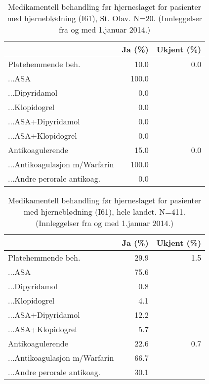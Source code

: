 \documentclass [norsk,a4paper,twoside]{article}\usepackage[]{graphicx}\usepackage[]{color}
\begin{document}
		
\begin{table}[ht]
\centering
\begin{tabular}{lrr}
  \hline
 & Ja (\%) & Ukjent (\%) \\ 
  \hline
Platehemmende beh. & 10.0 & 0.0 \\ 
  ...ASA & 100.0 &  \\ 
  ...Dipyridamol & 0.0 &  \\ 
  ...Klopidogrel & 0.0 &  \\ 
  ...ASA+Dipyridamol & 0.0 &  \\ 
  ...ASA+Klopidogrel & 0.0 &  \\ 
  Antikoagulerende & 15.0 & 0.0 \\ 
  ...Antikoagulasjon m/Warfarin & 100.0 &  \\ 
  ...Andre perorale antikoag. & 0.0 &  \\ 
   \hline
\end{tabular}
\caption{Medikamentell behandling før hjerneslaget for pasienter med hjerneblødning (I61), St. Olav. N=20. (Innleggelser fra og med 1.januar 2014.)} 
\label{tab:MedBehPre1Diag1}
\end{table}
\begin{table}[ht]
\centering
\begin{tabular}{lrr}
  \hline
 & Ja (\%) & Ukjent (\%) \\ 
  \hline
Platehemmende beh. & 29.9 & 1.5 \\ 
  ...ASA & 75.6 &  \\ 
  ...Dipyridamol & 0.8 &  \\ 
  ...Klopidogrel & 4.1 &  \\ 
  ...ASA+Dipyridamol & 12.2 &  \\ 
  ...ASA+Klopidogrel & 5.7 &  \\ 
  Antikoagulerende & 22.6 & 0.7 \\ 
  ...Antikoagulasjon m/Warfarin & 66.7 &  \\ 
  ...Andre perorale antikoag. & 30.1 &  \\ 
   \hline
\end{tabular}
\caption{Medikamentell behandling før hjerneslaget for pasienter med hjerneblødning (I61), hele landet. N=411. (Innleggelser fra og med 1.januar 2014.)} 
\label{tab:MedBehPre2Diag1}
\end{table}
\end{document}
